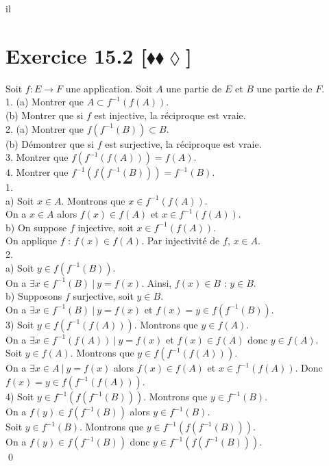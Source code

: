 il\documentclass[10pt]{article}
\begin{document}
\section*{Exercice 15.2 [$\blacklozenge\blacklozenge\lozenge$]}
\begin{tcolorbox}[enhanced, width=7.6in, center, size=fbox, fontupper=\large, drop shadow southwest]
    Soit $f:E\to F$ une application. Soit $A$ une partie de $E$ et $B$ une partie de $F$.\\
    1. (a) Montrer que $A \subset f^{-1}(f(A))$.\\
    (b) Montrer que si $f$ est injective, la réciproque est vraie.\\
    2. (a) Montrer que $f(f^{-1}(B)) \subset B$.\\
    (b) Démontrer que si $f$ est surjective, la réciproque est vraie.\\
    3. Montrer que $f(f^{-1}(f(A))) = f(A)$.\\
    4. Montrer que $f^{-1}(f(f^{-1}(B)))=f^{-1}(B)$.\\[0.15cm]
    1.\\
    a) Soit $x\in A$. Montrons que $x\in f^{-1}(f(A))$.\\
    On a $x\in A$ alors $f(x) \in f(A)$ et $x\in f^{-1}(f(A))$.\\
    b) On suppose $f$ injective, soit $x \in f^{-1}(f(A))$.\\
    On applique $f$ : $f(x) \in f(A)$. Par injectivité de $f$, $x \in A$.\\[0.2cm]
    2.\\
    a) Soit $y \in f(f^{-1}(B))$.\\
    On a $\exists x \in f^{-1}(B) ~ | ~ y = f(x)$. Ainsi, $f(x)\in B$ : $y\in B$.\\
    b) Supposons $f$ surjective, soit $y\in B$.\\
    On a $\exists x \in f^{-1}(B) ~ | ~ y = f(x)$ et $f(x) = y \in f(f^{-1}(B))$.\\[0.2cm]
    3) Soit $y\in f(f^{-1}(f(A)))$. Montrons que $y\in f(A)$.\\
    On a $\exists x \in f^{-1}(f(A)) ~ | ~ y = f(x)$ et $f(x) \in f(A)$ donc $y \in f(A)$.\\
    Soit $y\in f(A)$. Montrons que $y\in f(f^{-1}(f(A)))$.\\
    On a $\exists x \in A ~ | ~ y = f(x)$ alors $f(x) \in f(A)$ et $x\in f^{-1}(f(A))$. Donc $f(x) = y \in f(f^{-1}(f(A)))$.\\[0.2cm]
    4) Soit $y \in f^{-1}(f(f^{-1}(B)))$. Montrons que $y \in f^{-1}(B)$.\\
    On a $f(y) \in f(f^{-1}(B))$ alors $y \in f^{-1}(B)$.\\
    Soit $y\in f^{-1}(B)$. Montrons que $y\in f^{-1}(f(f^{-1}(B)))$.\\
    On a $f(y) \in f(f^{-1}(B))$ donc $y \in f^{-1}(f(f^{-1}(B)))$.\\
    \qed
\end{tcolorbox}
\end{document}
